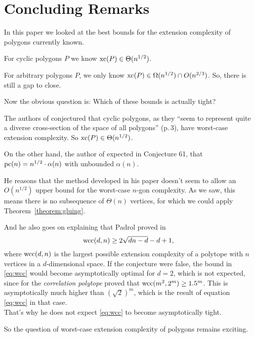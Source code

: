 \section{Concluding Remarks}

In this paper we looked at the best bounds for the extension complexity of polygons currently known.

For cyclic polygons $P$ we know $\operatorname{xc}(P) \in \Theta(n^{1/2})$.

For arbitrary polygons $P$, we only know $\operatorname{xc}(P) \in \Omega(n^{1/2}) \cap O(n^{2/3})$. So, there is still a gap to close.

Now the obvious question is: Which of these bounds is actually tight?

The authors of \cite{kwan2020extension} conjectured that cyclic polygons, as they ``seem to represent quite a diverse cross-section of the space of all polygons'' (p.\,3), have worst-case extension complexity. So $\operatorname{xc}(P) \in \Theta(n^{1/2})$.

On the other hand, the author of \cite{shitov2020sublinear} expected in Conjecture 61, that $\operatorname{pc}(n) = n^{1/2} \cdot \alpha(n)$ with unbounded $\alpha(n)$.

He reasons that the method developed in his paper doesn't seem to allow an $O(n^{1/2})$ upper bound for the worst-case $n$-gon complexity. As we saw, this means there is no subsequence of $\Theta(n)$ vertices, for which we could apply Theorem~\ref{theorem:gluing}.

And he also goes on explaining that Padrol proved in \cite{padrol2016extension}
\begin{equation}\label{eq:wcc}
  \operatorname{wcc}(d,n) \geq 2\sqrt{dn-d}-d+1 ,
\end{equation}
where $\operatorname{wcc}(d,n)$ is the largest possible extension complexity of a polytope with $n$ vertices in a $d$-dimensional space.
If the conjecture were false, the bound in \eqref{eq:wcc} would become asymptotically optimal for $d=2$, which is not expected, since for the \emph{correlation polytope} \cite{kaibel2015short} proved that $\operatorname{wcc}(m^2,2^m) \geq 1.5^m$. This is asymptotically much higher than $(\sqrt{2})^m$, which is the result of equation \eqref{eq:wcc} in that case.\\
That's why he does not expect \eqref{eq:wcc} to become asymptotically tight.

So the question of worst-case extension complexity of polygons remains exciting.
